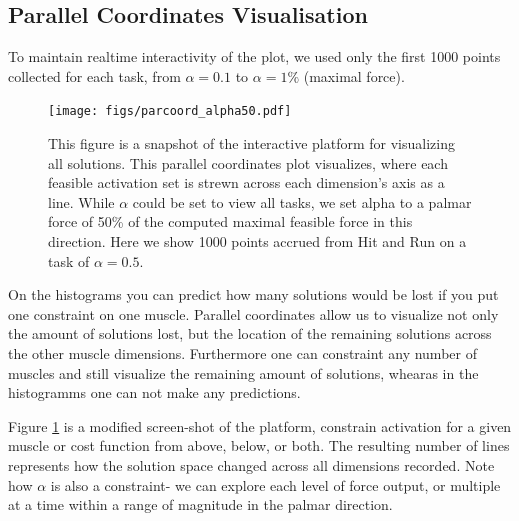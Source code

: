 \subsection{Parallel Coordinates Visualisation}
To maintain realtime interactivity of the plot, we used only the first 1000 points collected for each task, from $\alpha = 0.1$ to $\alpha = 1\%$ (maximal force).

\begin{figure}[htbp]
\centering
\texttt{[image: figs/parcoord\_alpha50.pdf]}
\caption{This figure is a snapshot of the interactive platform for visualizing all solutions. This parallel coordinates plot visualizes, where each feasible activation set is strewn across each dimension's axis as a line. While $\alpha$ could be set to view all tasks, we set alpha to a palmar force of 50\% of the computed maximal feasible force in this direction. Here we show 1000 points accrued from Hit and Run on a task of $\alpha=0.5$.}
\label{fig:parcoord_full}
\end{figure}

On the histograms you can predict how many solutions would be lost if you put one constraint on one muscle. Parallel coordinates allow us to visualize not only the amount of solutions lost, but the location of the remaining solutions across the other muscle dimensions. Furthermore one can constraint any number of muscles and still visualize the remaining amount of solutions, whearas in the histogramms one can not make any predictions.

Figure \ref{fig:parcoord_full} is a modified screen-shot of the platform, constrain activation for a given muscle or cost function from above, below, or both. The resulting number of lines represents how the solution space changed across all dimensions recorded.
Note how $\alpha$ is also a constraint- we can explore each level of force output, or multiple at a time within a range of magnitude in the palmar direction.

